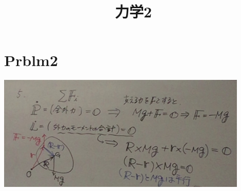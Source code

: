 \documentclass{jsarticle}
\title{力学2}
\begin{document}
\section{Prblm2}
	\begin{center}
		\includegraphics[width=12cm]{5_13_1.JPG}
	\end{center}
	
\end{document}
